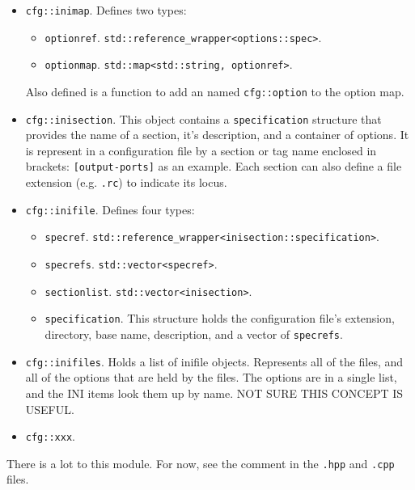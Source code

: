    \begin{itemize}
      \item \texttt{cfg::inimap}.
         Defines two types:
         \begin{itemize}
            \item \texttt{optionref}.
               \texttt{std::reference\_wrapper<options::spec>}.
            \item \texttt{optionmap}.
               \texttt{std::map<std::string, optionref>}.
         \end{itemize}
         Also defined is a function to add an named \texttt{cfg::option}
         to the option map.
      \item \texttt{cfg::inisection}.
         This object contains a \texttt{specification} structure that
         provides the name of a section, it's description, and
         a container of options.
         It is represent in a configuration file by a section or tag name
         enclosed in brackets:  \texttt{[output-ports]} as an example.
         Each section can also define a file extension
         (e.g. \texttt{.rc}) to indicate its locus.
      \item \texttt{cfg::inifile}.
         Defines four types:
         \begin{itemize}
            \item \texttt{specref}.
                \texttt{std::reference\_wrapper<inisection::specification>}.
            \item \texttt{specrefs}.
                \texttt{std::vector<specref>}.
            \item \texttt{sectionlist}.
               \texttt{std::vector<inisection>}.
            \item \texttt{specification}.
               This structure holds the configuration file's extension,
               directory, base name, description, and a vector of
               \texttt{specrefs}.
         \end{itemize}
      \item \texttt{cfg::inifiles}.
         Holds a list of inifile objects. Represents all of the files, and all of
         the options that are held by the files.  The options are in a single list,
         and the INI items look them up by name.
         NOT SURE THIS CONCEPT IS USEFUL.
      \item \texttt{cfg::xxx}.
   \end{itemize}

   There is a lot to this module.
   For now, see the comment in the \texttt{.hpp} and \texttt{.cpp} files.

